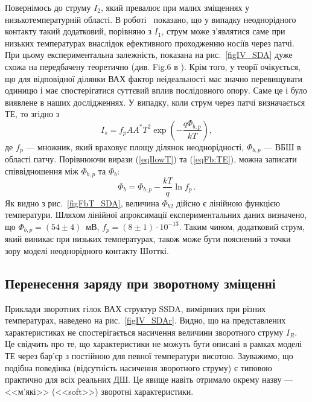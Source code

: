 Повернімось до струму $I_2$, який превалює при малих зміщеннях у низькотемпературній області.
В роботі~\cite{Tung:PhysRev} показано, що у випадку неоднорідного контакту такий додатковий, порівняно з $I_1$, струм
може з'являтися саме при низьких температурах внаслідок ефективного проходженню носіїв через патчі.
При цьому експериментальна залежність, показана на рис.~\ref{figIV_SDA} дуже схожа на передбачену теоретично (див. Fig.6 в \cite{Tung:PhysRev}).
Крім того, у теорії очікується, що для відповідної ділянки ВАХ фактор неідеальності має значно перевищувати одиницю
і має спостерігатися суттєвий вплив послідовного опору.
Саме це і було виявлене в наших дослідженнях.
У випадку, коли струм через патчі визначається ТЕ, то згідно з \cite{Sarpatwari, Tung:PhysRev}
\begin{equation}\label{eqIlowT}
I_s=f_pAA^*T^2\exp\left(-\frac{q\Phi_{b,p}}{kT}\right),
\end{equation}
де
$f_p$  --- множник, який враховує площу ділянок неоднорідності,
$\Phi_{b,p}$ --- ВБШ в області патчу.
Порівнюючи вирази (\ref{eqIlowT}) та (\ref{eqFb:TE}), можна
записати співвідношення між $\Phi_{b,p}$ та $\Phi_{b}$:
\begin{equation}\label{eqFbFbp}
\Phi_b=\Phi_{b,p}-\frac{kT}{q}\ln{f_p}\,.
\end{equation}
Як видно з рис.~\ref{figFbT_SDA}, величина $\Phi_{b2}$ дійсно є лінійною функцією температури.
Шляхом лінійної апроксимації експериментальних даних визначено, що $\Phi_{b,p}=(54\pm4)$~мВ,
$f_p=(8\pm1)\cdot10^{-13}$.
Таким чином, додатковий струм, який виникає при низьких температурах, також може бути пояснений з точки
зору моделі неоднорідного контакту Шотткі.

\subsection{Перенесення заряду при зворотному зміщенні}

Приклади зворотних гілок ВАХ структур SSDA, виміряних при різних температурах, наведено на рис.~\ref{figIV_SDAr}.
Видно, що на представлених характеристиках не спостерігається насичення величини зворотного струму $I_R$.
Це свідчить про те,
що характеристики не можуть бути описані в рамках моделі ТЕ через бар'єр з постійною для певної температури висотою.
Зауважимо, що подібна поведінка (відсутність насичення зворотного струму) є типовою
практично для всіх реальних ДШ.
Це явище навіть отримало окрему назву --- <<м'які>> (<<soft>>) зворотні характеристики.

